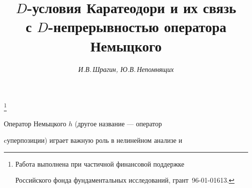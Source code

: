 \renewcommand{\baselinestretch}{1.1}


 




 


\setcounter{page}{70} 












\author{\it И.В.\,Шрагин, Ю.В.\,Непомнящих} 


\title{$D$-условия Каратеодори и их связь \\


с $D$-непрерывностью оператора Немыцкого} 


 


\thanks{Работа выполнена при частичной финансовой поддержке


Российского фонда фундаментальных исследований, грант \No\,96-01-01613.}


\date{} 




 


\pagestyle{plain} %


 


 




 


\maketitle 


 







Оператор Немыцкого $h$ (другое название --- оператор


cуперпозиции) играет важную роль в нелинейном анализе и


